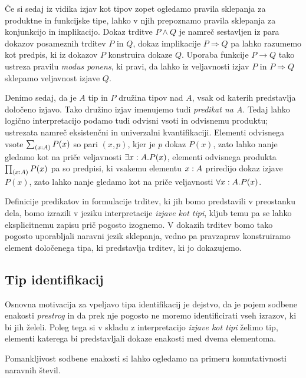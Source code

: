 Če si sedaj iz vidika izjav kot tipov zopet ogledamo pravila sklepanja za produktne in
funkcijske tipe, lahko v njih prepoznamo
pravila sklepanja za konjunkcijo in implikacijo. Dokaz trditve \(P \wedge Q\) je namreč sestavljen
iz para dokazov posameznih trditev \(P\) in \(Q\), dokaz implikacije \(P \Rightarrow Q\) pa lahko razumemo
kot predpis, ki iz dokazov \(P\) konstruira dokaze \(Q\). Uporaba funkcije \(P \to Q\)
tako ustreza pravilu \emph{modus ponens}, ki pravi, da lahko iz veljavnosti izjav \(P\) in \(P \Rightarrow Q\)
sklepamo veljavnost izjave \(Q\).

Denimo sedaj, da je \(A\) tip in \(P\) družina tipov nad \(A\), vsak od katerih predstavlja določeno
izjavo. Tako družino izjav imenujemo tudi \emph{predikat na A}.
Tedaj lahko logično interpretacijo podamo tudi odvisni vsoti in odvisnemu produktu;
ustrezata namreč eksistenčni in univerzalni kvantifikaciji. Elementi odvisnega vsote
\(\textstyle \sum_{\left( x : A \right)} P(x)\) so pari \((x, p)\), kjer je \(p\) dokaz \(P(x)\), zato lahko nanje gledamo
kot na priče veljavnosti \(\exists x : A. P(x)\), elementi odvisnega produkta
\(\textstyle \prod_{\left( x : A \right)} P(x)\) pa so predpisi, ki vsakemu elementu \(x : A\) priredijo
dokaz izjave \(P(x)\), zato lahko nanje gledamo kot na priče veljavnosti
\(\forall x : A.P(x)\).

Definicije predikatov in formulacije trditev, ki jih bomo predstavili v preostanku dela, bomo
izrazili v jeziku interpretacije \emph{izjave kot tipi}, kljub temu pa se lahko eksplicitnemu
zapisu prič pogosto izognemo. V dokazih trditev bomo tako pogosto uporabljali naravni
jezik sklepanja, vedno pa pravzaprav konstruiramo element določenega tipa, ki predstavlja trditev, ki jo dokazujemo.

\subsection{Tip identifikacij}
Osnovna motivacija za vpeljavo tipa identifikacij je dejstvo, da je pojem sodbene enakosti
\emph{prestrog} in da prek nje pogosto ne moremo identificirati vseh izrazov, ki bi
jih želeli. Poleg tega si v skladu z interpretacijo \emph{izjave kot tipi} želimo tip, elementi
katerega bi predstavljali dokaze enakosti med dvema elementoma.

Pomankljivost sodbene enakosti si lahko ogledamo na primeru
komutativnosti naravnih števil.

